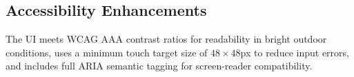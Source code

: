 \subsection{Accessibility Enhancements}
The UI meets WCAG AAA contrast ratios for readability in bright outdoor conditions, uses a minimum touch target size of $48\times 48$px to reduce input errors, and includes full ARIA semantic tagging for screen-reader compatibility.


